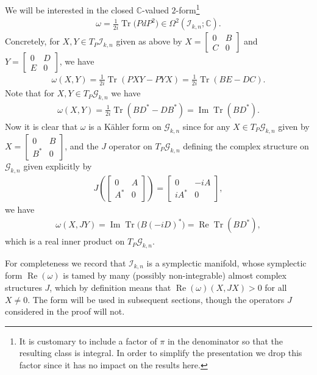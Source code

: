 \documentclass[10pt,a4paper]{amsart}
\DeclareMathOperator{\Tr}{Tr}
\numberwithin{equation}{section}
\newcommand{\CC}{\mathbb{C}}
\newcommand{\cG}{{\mathcal G}}
\newcommand{\cI}{{\mathcal I}}
\newcommand{\Om}{\Omega}
\begin{document}
We will be interested in the closed $\CC$-valued $2$-form\footnote{It is customary to include a factor of $\pi$ in the denominator so that the resulting class is integral. In order to simplify the presentation we drop this factor since it has no impact on the results here.}
\begin{gather*}
\omega = \frac {1}{2i} \Tr\big(P dP^2\big) \in \Om^2 ( \cI_{k,n} ; \CC).
\end{gather*}
Concretely, for $X,Y \in T_P \cI_{k,n}$ given as above by
$X =\left[
\begin{smallmatrix}
0 & B \\
C & 0
\end{smallmatrix}\right]$ and
$Y =\left[
\begin{smallmatrix}
0 & D \\
E & 0
\end{smallmatrix}\right]$, we have
\begin{gather*}
\omega(X,Y) = \frac {1}{2i} \Tr(PXY - PYX) = \frac {1}{2i} \Tr (BE - DC) .
\end{gather*}
Note that for $X,Y \in T_P \cG_{k,n}$ we have
\begin{gather*}
\omega(X,Y) = \frac {1}{2i} \Tr(BD^* - DB^*) = \operatorname{Im} \Tr(BD^*).
\end{gather*}
Now it is clear that $\omega$ is a K\"ahler form on $ \cG_{k,n}$ since for any $X \in T_P \cG_{k,n}$ given by
$X =\left[
\begin{smallmatrix}
0 & B \\
B^* & 0
\end{smallmatrix}\right]$, and the $J$ operator on $T_P \cG_{k,n}$ defining the complex structure on $\cG_{k,n}$ given explicitly by
\begin{gather*}
J\left(
\begin{bmatrix}
0 & A \\
A^* & 0
\end{bmatrix}
\right)
=
\begin{bmatrix}
0 & -iA \\
iA^* & 0
\end{bmatrix},
\end{gather*}
we have
\begin{gather*}
\omega(X,JY) = \operatorname{Im} \Tr \big(B (-iD)^*\big) = \operatorname{Re} \Tr(B D^*),
\end{gather*}
which is a real inner product on $T_P \cG_{k,n}$.

For completeness we record that $\cI_{k,n}$ is a symplectic manifold, whose symplectic form $\operatorname{Re}(\omega)$ is tamed by many (possibly non-integrable) almost complex structures $J$, which by definition means that $\operatorname{Re}(\omega)(X,JX) >0$ for all $X\neq 0$. The form will be used in subsequent sections, though the operators $J$ considered in the proof will not.
\end{document}
